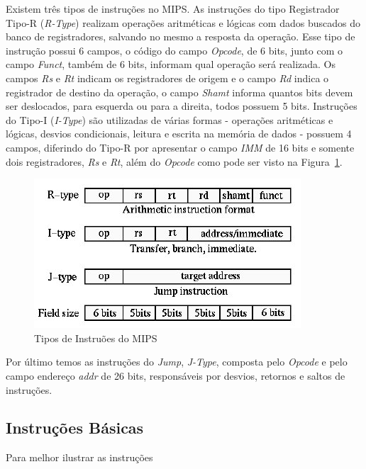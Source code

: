 Existem três tipos de instruções no MIPS. As instruções do tipo Registrador Tipo-R (\textit{R-Type}) realizam operações aritméticas e lógicas com dados buscados do banco de registradores, salvando no mesmo a resposta da operação. Esse tipo de instrução possui 6 campos, o código do campo \textit{Opcode}, de 6 bits, junto com o campo \textit{Funct}, também de 6 bits, informam qual operação será realizada. Os campos \textit{Rs} e \textit{Rt} indicam os registradores de origem e o campo \textit{Rd} indica o registrador de destino da operação, o campo \textit{Shamt} informa quantos bits devem ser deslocados, para esquerda ou para a direita, todos possuem 5 bits. Instruções do Tipo-I (\textit{I-Type}) são utilizadas de várias formas - operações aritméticas e lógicas, desvios condicionais, leitura e escrita na memória de dados \cite{cruz1} - possuem 4 campos, diferindo do Tipo-R por apresentar o campo \textit{IMM} de 16 bits e somente dois registradores, \textit{Rs} e \textit{Rt}, além do \textit{Opcode} como pode ser visto na Figura~{\ref{fig:figura-mips-001}}.

\begin{figure}[h]
    \centering
    \includegraphics[width=0.48 \textwidth]{figuras/MIPS-Instruction-Type_W840.jpg}
    \caption{Tipos de Instruões do MIPS \cite{misc1}}
    \label{fig:figura-mips-001}
\end{figure}

Por último temos as instruções do \textit{Jump}, \textit{J-Type}, composta pelo \textit{Opcode} e pelo campo endereço \textit{addr} de 26 bits, responsáveis por desvios, retornos e saltos de instruções.

\subsection{Instruções Básicas}
Para melhor ilustrar as instruções 
